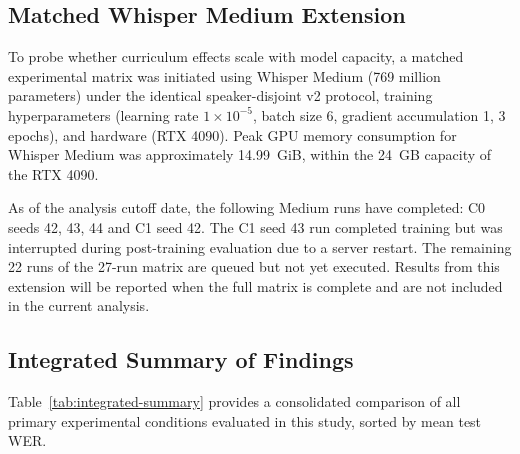 \subsection{Matched Whisper Medium Extension}
\label{sec:medium-extension}

To probe whether curriculum effects scale with model capacity, a matched
experimental matrix was initiated using Whisper Medium (769 million parameters)
under the identical speaker-disjoint v2 protocol, training hyperparameters
(learning rate $1 \times 10^{-5}$, batch size 6, gradient accumulation 1, 3
epochs), and hardware (RTX 4090). Peak GPU memory consumption for Whisper Medium
was approximately 14.99~GiB, within the 24~GB capacity of the RTX 4090.

As of the analysis cutoff date, the following Medium runs have completed: C0
seeds 42, 43, 44 and C1 seed 42. The C1 seed 43 run completed training but was
interrupted during post-training evaluation due to a server restart. The
remaining 22 runs of the 27-run matrix are queued but not yet executed. Results
from this extension will be reported when the full matrix is complete and are
not included in the current analysis.


\subsection{Integrated Summary of Findings}
\label{sec:integrated-findings}

Table~\ref{tab:integrated-summary} provides a consolidated comparison of all
primary experimental conditions evaluated in this study, sorted by mean test
WER.

